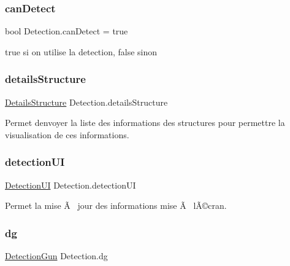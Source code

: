\subsubsection{\texorpdfstring{can\+Detect}{canDetect}}
{\footnotesize\ttfamily bool Detection.\+can\+Detect = true\hspace{0.3cm}{\ttfamily [private]}}



true si on utilise la detection, false sinon 

\mbox{\label{class_detection_aa183bc717a4ba8c4371e319eb16fcd23}} 
\subsubsection{\texorpdfstring{details\+Structure}{detailsStructure}}
{\footnotesize\ttfamily \mbox{\hyperlink{class_details_structure}{Details\+Structure}} Detection.\+details\+Structure\hspace{0.3cm}{\ttfamily [private]}}



Permet d\textquotesingle{}envoyer la liste des informations des structures pour permettre la visualisation de ces informations. 

\mbox{\label{class_detection_a2cb88a432e8b2083f27a286a32daf936}} 
\subsubsection{\texorpdfstring{detection\+UI}{detectionUI}}
{\footnotesize\ttfamily \mbox{\hyperlink{class_detection_u_i}{Detection\+UI}} Detection.\+detection\+UI\hspace{0.3cm}{\ttfamily [private]}}



Permet la mise Ã  jour des informations mise Ã  l\textquotesingle{}Ã©cran. 

\mbox{\label{class_detection_a87f5c7e3ca25b83485fd648d0a512ae5}} 
\subsubsection{\texorpdfstring{dg}{dg}}
{\footnotesize\ttfamily \mbox{\hyperlink{class_detection_gun}{Detection\+Gun}} Detection.\+dg\hspace{0.3cm}{\ttfamily [private]}}



